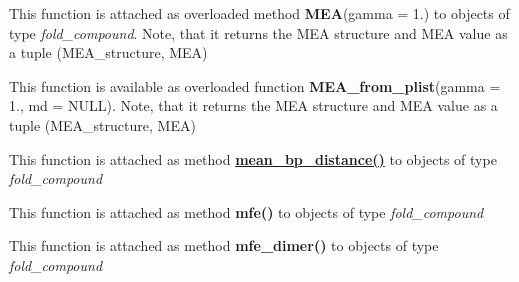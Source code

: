 \begin{DoxyRefList}
\item[Global \mbox{\hyperlink{group__mea__fold_ga9b87b664ef014c1266aa50d5bc39f2ac}{vrna\+\_\+\+M\+EA}} (vrna\+\_\+fold\+\_\+compound\+\_\+t $\ast$fc, double gamma, float $\ast$mea)]\label{wrappers__wrappers000116}%
%
 This function is attached as overloaded method {\bfseries{M\+EA}}(gamma = 1.) to objects of type {\itshape fold\+\_\+compound}. Note, that it returns the M\+EA structure and M\+EA value as a tuple (M\+E\+A\+\_\+structure, M\+EA)  
\item[Global \mbox{\hyperlink{group__mea__fold_ga26afeef667f7013a743d1d1ebe42666a}{vrna\+\_\+\+M\+E\+A\+\_\+from\+\_\+plist}} (vrna\+\_\+ep\+\_\+t $\ast$plist, const char $\ast$sequence, double gamma, vrna\+\_\+md\+\_\+t $\ast$md, float $\ast$mea)]\label{wrappers__wrappers000117}%
%
 This function is available as overloaded function {\bfseries{M\+E\+A\+\_\+from\+\_\+plist}}(gamma = 1., md = N\+U\+LL). Note, that it returns the M\+EA structure and M\+EA value as a tuple (M\+E\+A\+\_\+structure, M\+EA)  
\item[Global \mbox{\hyperlink{group__part__func__global_gaa6b8983b559b9ef4b2e1b31113ea317b}{vrna\+\_\+mean\+\_\+bp\+\_\+distance}} (vrna\+\_\+fold\+\_\+compound\+\_\+t $\ast$vc)]\label{wrappers__wrappers000111}%
%
 This function is attached as method {\bfseries{\mbox{\hyperlink{group__part__func__global__deprecated_ga79cbc375af65f11609feb6b055269e7d}{mean\+\_\+bp\+\_\+distance()}}}} to objects of type {\itshape fold\+\_\+compound}  
\item[Global \mbox{\hyperlink{group__mfe__global_gabd3b147371ccf25c577f88bbbaf159fd}{vrna\+\_\+mfe}} (vrna\+\_\+fold\+\_\+compound\+\_\+t $\ast$vc, char $\ast$structure)]\label{wrappers__wrappers000088}%
%
 This function is attached as method {\bfseries{mfe()}} to objects of type {\itshape fold\+\_\+compound}  
\item[Global \mbox{\hyperlink{group__mfe__global_gaab22d10c1190f205f16a77cab9d5d3ee}{vrna\+\_\+mfe\+\_\+dimer}} (vrna\+\_\+fold\+\_\+compound\+\_\+t $\ast$vc, char $\ast$structure)]\label{wrappers__wrappers000089}%
%
 This function is attached as method {\bfseries{mfe\+\_\+dimer()}} to objects of type {\itshape fold\+\_\+compound}  
\item[Global \mbox{\hyperlink{group__mfe__window_ga689df235a1915a1ad56e377383c044ce}{vrna\+\_\+mfe\+\_\+window}} (vrna\+\_\+fold\+\_\+compound\+\_\+t $\ast$vc, F\+I\+LE $\ast$file)]\label{wrappers__wrappers000090}%

\end{DoxyRefList}
